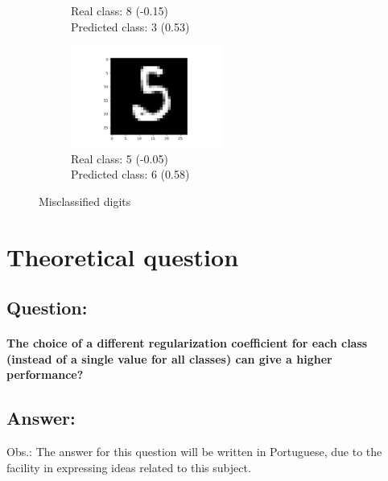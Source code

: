 \documentclass[a4paper]{article}    %
\begin{document}
\begin{figure}[H]
\begin{subfigure}{0.32\textwidth}
        \caption{
            Real class: 8 (-0.15)\\
            Predicted class: 3 (0.53)}
        \label{fig:example_11}
    \end{subfigure}
    \hfill
    \begin{subfigure}{0.32\textwidth}
        \centering
        \includegraphics[width=5.0cm]{20}
        \caption{
            Real class: 5 (-0.05)\\
            Predicted class: 6 (0.58)}
        \label{fig:example_12}
    \end{subfigure}
    \hfill
    \caption{Misclassified digits} 
    \label{fig:misclassified_digits}
\end{figure}

\newpage
\section{Theoretical question}

\subsection{\textbf{Question:}}

\paragraph{The choice of a different regularization coefficient for each class (instead of a single value for all classes) can give a higher performance?}

\subsection{\textbf{Answer:}}

Obs.: The answer for this question will be written in Portuguese, due to the facility in expressing ideas related to this subject.
\end{document}
